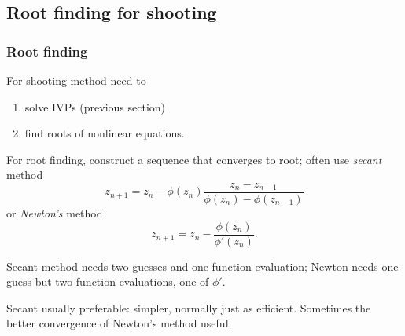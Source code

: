 \documentclass{beamer}
\begin{document}
\subsection{Root finding for shooting}

\begin{frame}
  \frametitle{Root finding}

  For shooting method need to
  \begin{enumerate}
  \item solve IVPs (previous section)
  \item find roots of nonlinear equations.
  \end{enumerate} \pause
  For root finding, construct a sequence that converges to root; often
  use \emph{secant} method
  \begin{equation*}
    z_{n+1} = z_n - \phi(z_n) \frac{z_n - z_{n-1}}{\phi(z_n) -
      \phi(z_{n-1})}
  \end{equation*}
  or \emph{Newton's} method
  \begin{equation*}
    z_{n+1} = z_n - \frac{\phi(z_n)}{\phi'(z_n)}.
  \end{equation*} \pause

  \vspace{1ex}

  Secant method needs two guesses and one function evaluation; Newton
  needs one guess but two function evaluations, one of $\phi'$.
  \pause

  \vspace{1ex}

  Secant usually preferable: simpler, normally just as
  efficient. Sometimes the better convergence of Newton's method
  useful.

\end{frame}
\end{document}
